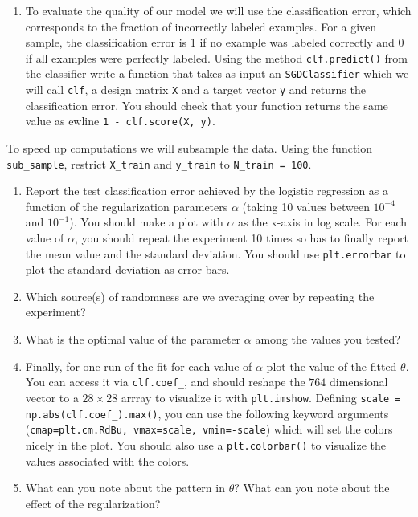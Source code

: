 \documentclass{article}
\begin{document}
\begin{enumerate}
\setcounter{enumi}{\value{saveenum}}
  \item To evaluate the quality of our model we will use the classification error, which corresponds to the fraction of incorrectly labeled examples. For a given sample, the classification error is 1 if no example was labeled correctly and 0 if all examples were perfectly labeled. 
  Using the method \texttt{clf.predict()} from the classifier write a function that takes as input an \texttt{SGDClassifier} which we will call \texttt{clf}, a design matrix \texttt{X} and a target vector \texttt{y} and returns the classification error. You should check that your function returns the same value as ewline \texttt{1 - clf.score(X, y)}.
\setcounter{saveenum}{\value{enumi}}
\end{enumerate}


To speed up computations we will subsample the data. Using the function \texttt{sub\_sample}, restrict \texttt{X\_train} and \texttt{y\_train} to \texttt{N\_train = 100}. 

\begin{enumerate}
\setcounter{enumi}{\value{saveenum}}
  \item Report the test classification error achieved by the logistic regression as a function of the regularization parameters $\alpha$ (taking 10 values between $10^{-4}$ and $10^{-1}$). You should make a plot with $\alpha$ as the x-axis in log scale. For each value of $\alpha$, you should repeat the experiment 10 times so has to finally report the mean value and the standard deviation. You should use \texttt{plt.errorbar} to plot the standard deviation as error bars.
  
  \item Which source(s) of randomness are we averaging over by repeating the experiment?

  
  \item What is the optimal value of the parameter $\alpha$ among the values you tested? 

  \item Finally, for one run of the fit for each value of $\alpha$ plot the value of the fitted $\theta$. You can access it via \texttt{clf.coef\_}, and should reshape the $764$ dimensional vector to a $28\times 28$ arrray to visualize it with \texttt{plt.imshow}. Defining \texttt{scale = np.abs(clf.coef\_).max()}, you can use the following keyword arguments (\texttt{cmap=plt.cm.RdBu, vmax=scale, vmin=-scale}) which will set the colors nicely in the plot. You should also use a \texttt{plt.colorbar()} to visualize the values associated with the colors.
  
  \item What can you note about the pattern in $\theta$? What can you note about the effect of the regularization?

\setcounter{saveenum}{\value{enumi}}
\end{enumerate}
\end{document}
